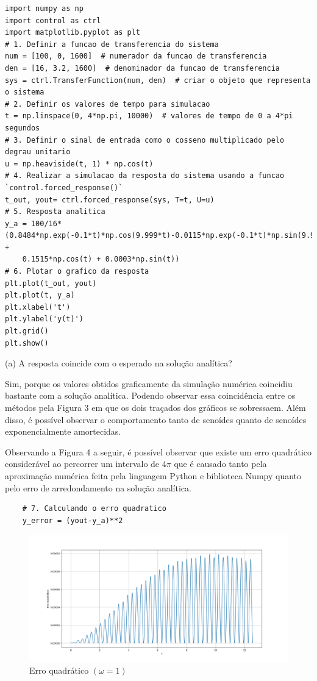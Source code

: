 \documentclass[10pt]{article}
\begin{document}
\begin{lstlisting}
import numpy as np
import control as ctrl
import matplotlib.pyplot as plt
# 1. Definir a funcao de transferencia do sistema
num = [100, 0, 1600]  # numerador da funcao de transferencia
den = [16, 3.2, 1600]  # denominador da funcao de transferencia
sys = ctrl.TransferFunction(num, den)  # criar o objeto que representa o sistema
# 2. Definir os valores de tempo para simulacao
t = np.linspace(0, 4*np.pi, 10000)  # valores de tempo de 0 a 4*pi segundos
# 3. Definir o sinal de entrada como o cosseno multiplicado pelo degrau unitario
u = np.heaviside(t, 1) * np.cos(t)
# 4. Realizar a simulacao da resposta do sistema usando a funcao `control.forced_response()`
t_out, yout= ctrl.forced_response(sys, T=t, U=u)
# 5. Resposta analitica
y_a = 100/16*(0.8484*np.exp(-0.1*t)*np.cos(9.999*t)-0.0115*np.exp(-0.1*t)*np.sin(9.999*t) +
    0.1515*np.cos(t) + 0.0003*np.sin(t))
# 6. Plotar o grafico da resposta
plt.plot(t_out, yout)
plt.plot(t, y_a)
plt.xlabel('t')
plt.ylabel('y(t)')
plt.grid()
plt.show()
\end{lstlisting}

(a) A resposta coincide com o esperado na solução analítica?

\quad Sim, porque os valores obtidos graficamente da simulação numérica coincidiu bastante com a solução analítica.
Podendo observar essa coincidência entre os métodos pela Figura 3 em que os dois traçados dos gráficos se sobressaem.
Além disso, é possível observar o comportamento tanto de senoídes quanto de senoídes exponencialmente amortecidas.

\quad Observando a Figura 4 a seguir, é possível observar que existe um erro quadrático considerável
ao percorrer um intervalo de 4$\pi$ que é causado tanto pela aproximação numérica feita pela linguagem Python e biblioteca Numpy
quanto pelo erro de arredondamento na solução analítica.

\begin{lstlisting}
    # 7. Calculando o erro quadratico
    y_error = (yout-y_a)**2
\end{lstlisting}

\newpage

\begin{figure}[h]
    \centering
    \includegraphics[scale=0.4]{erro1.png}
    \caption{Erro quadrático $(\omega = 1)$}
\end{figure}
\end{document}
